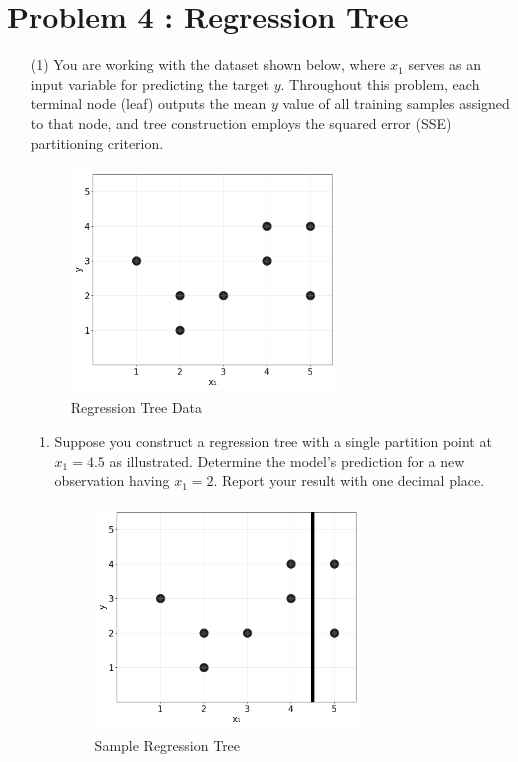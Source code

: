 \documentclass[11pt,addpoints,answers]{exam}
\newcounter{subq}        %
\renewcommand{\thesubq}{(\alph{subq})}  %
\newenvironment{subquestions}{
	\setcounter{subq}{0}%
	\begin{enumerate}[
		label=\thesubq,
		leftmargin=*,
		align=left,
		itemsep=6pt
		]
	}{
	\end{enumerate}
}
\newcommand{\subquestion}{\refstepcounter{subq}\item}  %
\begin{document}
	\section*{Problem 4 : Regression Tree}
	\begin{enumerate}[label=\alph*), itemsep=10pt]
		\item[(1)] You are working with the dataset shown below, where $x_1$ serves as an input variable for predicting the target $y$. Throughout this problem, each terminal node (leaf) outputs the mean $y$ value of all training samples assigned to that node, and tree construction employs the squared error (SSE) partitioning criterion.
		
		\begin{figure}[H]
			\centering
			\includegraphics[width=7cm,height=6cm]{images/regression_tree_data.png}
			\caption{Regression Tree Data} \label{fig:reg5_data}  %
		\end{figure}
		
		\begin{subquestions}
			\subquestion Suppose you construct a regression tree with a single partition point at $x_1=4.5$ as illustrated. Determine the model's prediction for a new observation having $x_1 = 2$. Report your result with one decimal place.
			
			\begin{figure}[H]
				\centering
				\includegraphics[width=7cm,height=6cm]{images/regression_tree_choices.png}
				\caption{Sample Regression Tree} \label{fig:reg5_sample}  %
			\end{figure}
			

\end{subquestions}
\end{enumerate}
\end{document}

